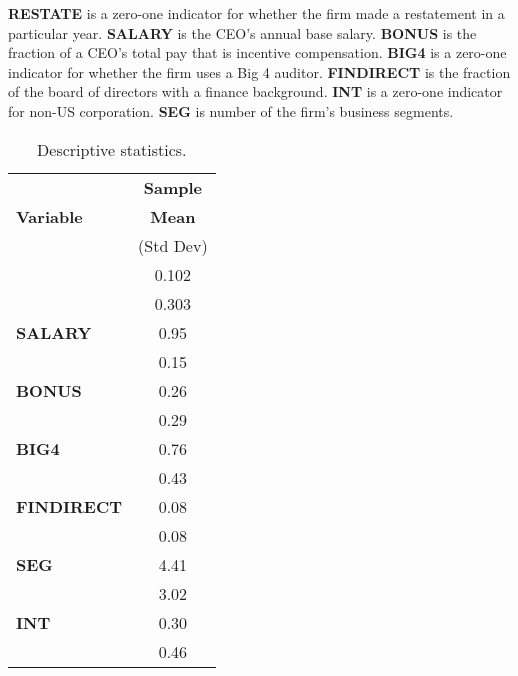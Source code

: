 \begin{table}[t]

\caption{Descriptive statistics.} \label{tab:desc}


{\bf RESTATE} is a zero-one indicator for whether the firm made a restatement in a particular year.
{\bf SALARY} is the CEO's annual base salary.  
{\bf BONUS} is the fraction of a CEO's total pay that is incentive compensation.  
{\bf BIG4} is a zero-one indicator for whether the firm uses a Big 4 auditor.
{\bf FINDIRECT} is the fraction of the board of directors with a finance background. 
{\bf INT} is a zero-one indicator for non-US corporation.  
{\bf SEG} is number of the firm's business segments.

\begin{center}
\begin{tabular}{|l|c|}
\hline
             & {\bf Sample }   \\
{\bf Variable}  &   {\bf Mean }   \\ 
          &  (Std Dev)   \\ \hline
\T {\bf RESTATE} &   0.102  \\
                           &   0.303  \\[.6em]
    {\bf SALARY} &     0.95  \\
                           &     0.15  \\[.6em]
    {\bf BONUS} &    0.26  \\
                           &     0.29  \\[.6em]
    {\bf BIG4} &   0.76  \\
                           &     0.43  \\[.6em]
    {\bf FINDIRECT} &    0.08  \\
                           &     0.08  \\[.6em]
    {\bf SEG} &    4.41  \\
                           &    3.02  \\[.6em]
    {\bf INT} &     0.30  \\
                           &     0.46  \\[.6em]
\hline
\end{tabular}
\end{center}
\end{table}

